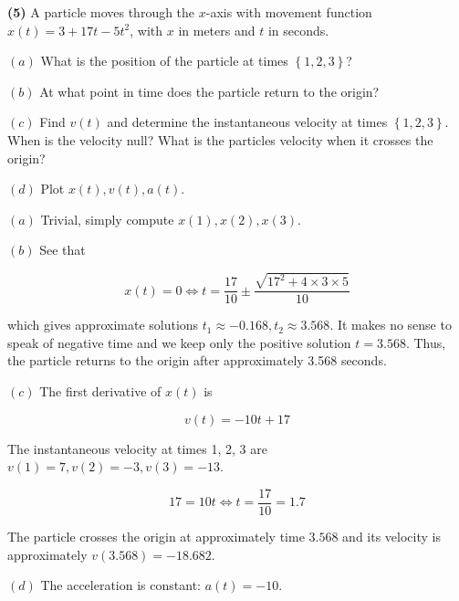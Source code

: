 \documentclass[12pt]{article}
\theoremstyle{definition}
\begin{document}
\pagebreak 

\begin{shaded}
    \textbf{(5)} A particle moves through the $x$-axis with movement function 
    $x(t) = 3 + 17t - 5t^2$, with $x$ in meters and $t$ in seconds. 

    $(a)$ What is the position of the particle at times $\left\{ 1, 2, 3
    \right\} $?

    $(b)$ At what point in time does the particle return to the origin? 

    $(c)$ Find $v(t)$ and determine the instantaneous velocity at times $\left\{
    1, 2, 3\right\} $. When is the velocity null? What is the particles velocity
    when it crosses the origin? 

    $(d)$ Plot $x(t), v(t), a(t)$.
\end{shaded}


$(a)$ Trivial, simply compute $x(1), x(2), x(3)$.

$(b)$ See that

\begin{equation*}
    x(t) = 0 \iff t = \frac{17}{10} \pm \frac{ \sqrt{17^2 + 4\times 3 \times 5}
    }{10}
\end{equation*}

which gives approximate solutions $t_1 \approx -0.168, t_2 \approx 3.568$. It
makes no sense to speak of negative time and we keep only the positive solution
$t = 3.568$. Thus, the particle returns to the origin after approximately 3.568
seconds.

$(c)$ The first derivative of $x(t)$ is 

\begin{equation*}
    v(t) = -10t + 17
\end{equation*}

The instantaneous velocity at times 1, 2, 3 are $v(1) = 7, v(2) = -3, v(3) = -13$.

\begin{equation*}
    17 = 10t \iff t = \frac{17}{10} = 1.7
\end{equation*}

The particle crosses the origin at approximately time $3.568$ and its velocity
is approximately $v(3.568) = -18.682$. 

$(d)$ The acceleration is constant: $a(t) = -10$.

\end{document}
